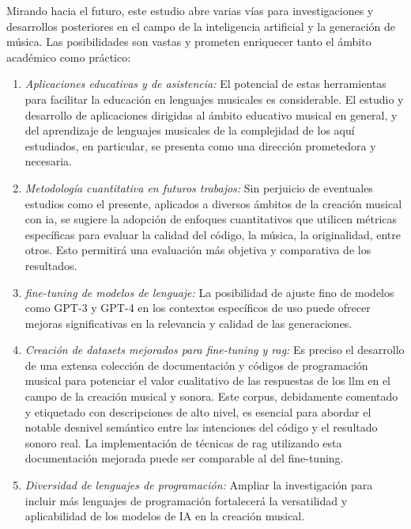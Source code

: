 Mirando hacia el futuro, este estudio abre varias vías para investigaciones y desarrollos posteriores en el campo de la inteligencia artificial y la generación de música. Las posibilidades son vastas y prometen enriquecer tanto el ámbito académico como práctico:

\begin{enumerate}
\item \textit{Aplicaciones educativas y de asistencia:} El potencial de estas herramientas para facilitar la educación en lenguajes musicales es considerable. El estudio y desarrollo de aplicaciones dirigidas al ámbito educativo musical en general, y del aprendizaje de lenguajes musicales de la complejidad de los aquí estudiados, en particular, se presenta como una dirección prometedora y necesaria.

\item \textit{Metodología cuantitativa en futuros trabajos:} Sin perjuicio de eventuales estudios como el presente, aplicados a diversos ámbitos de la creación musical con \gls{ia}, se sugiere la adopción de enfoques cuantitativos que utilicen métricas específicas para evaluar la calidad del código, la música, la originalidad, entre otros. Esto permitirá una evaluación más objetiva y comparativa de los resultados.

\item \textit{fine-tuning de modelos de lenguaje:} La posibilidad de ajuste fino de modelos como GPT-3 y GPT-4 en los contextos específicos de uso puede ofrecer mejoras significativas en la relevancia y calidad de las generaciones.

\item \textit{Creación de datasets mejorados para fine-tuning y \gls{rag}:} Es preciso el desarrollo de una extensa colección de documentación y códigos de programación musical para potenciar el valor cualitativo de las respuestas de los \gls{llm} en el campo de la creación musical y sonora. Este corpus, debidamente comentado y etiquetado con descripciones de alto nivel, es esencial para abordar el notable desnivel semántico entre las intenciones del código y el resultado sonoro real. La implementación de técnicas de \gls{rag} utilizando esta documentación mejorada puede ser comparable al del fine-tuning.

\item \textit{Diversidad de lenguajes de programación:} Ampliar la investigación para incluir más lenguajes de programación fortalecerá la versatilidad y aplicabilidad de los modelos de IA en la creación musical.


\end{enumerate}
